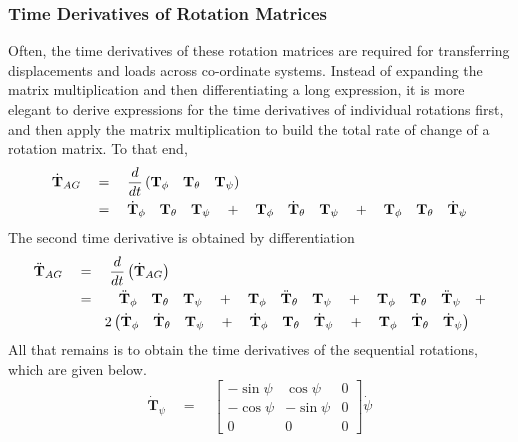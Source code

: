 \subsubsection*{Time Derivatives of Rotation Matrices}
Often, the time derivatives of these rotation matrices are required for transferring displacements and loads across co-ordinate systems. Instead of expanding the matrix multiplication and then differentiating a long expression, it is more elegant to derive expressions for the time derivatives of individual rotations first, and then apply the matrix multiplication to build the total rate of change of a rotation matrix. To that end,
\begin{align}
\dot{\textbf{T}}_{AG} & \quad = \quad \frac{d}{dt} \left( \textbf{T}_\phi \quad \textbf{T}_\theta \quad \textbf{T}_\psi \right) \notag \\
\label{eqn:Td}
& \quad = \quad \dot{\textbf{T}}_\phi \quad \textbf{T}_\theta \quad \textbf{T}_\psi \quad + \quad \textbf{T}_\phi \quad \dot{\textbf{T}}_\theta \quad \textbf{T}_\psi \quad + \quad \textbf{T}_\phi \quad \textbf{T}_\theta \quad \dot{\textbf{T}}_\psi 
\end{align}
The second time derivative is obtained by differentiation
\begin{align}
\ddot{\textbf{T}}_{AG} & \quad = \quad \frac{d}{dt} \left(\dot{\textbf{T}}_{AG} \right) \notag \\
& \quad =  \quad \textrm{  }\textrm{  } \ddot{\textbf{T}}_{\phi} \quad \textbf{T}_\theta \quad \textbf{T}_\psi \quad + \quad \textbf{T}_\phi \quad \ddot{\textbf{T}}_\theta \quad \textbf{T}_\psi \quad + \quad \textbf{T}_\phi \quad \textbf{T}_\theta \quad \ddot{\textbf{T}}_\psi \quad +  \notag \\
\label{eqn:Tdd}
&  \quad \qquad 2 \left( \dot{\textbf{T}}_\phi \quad \dot{\textbf{T}}_\theta \quad \textbf{T}_\psi \quad + \quad \dot{\textbf{T}}_\phi \quad \textbf{T}_\theta \quad \dot{\textbf{T}}_\psi \quad + \quad \textbf{T}_\phi \quad \dot{\textbf{T}}_\theta \quad \dot{\textbf{T}}_\psi \right)
\end{align}
All that remains is to obtain the time derivatives of the sequential rotations, which are given below.
\begin{equation*}
\dot{\textbf{T}}_\psi \quad = \quad \begin{bmatrix} -\sin \psi & \cos \psi & 0 \\ -\cos \psi & -\sin \psi & 0 \\ 0 & 0 & 0 \end{bmatrix} \dot{\psi}
\end{equation*}
